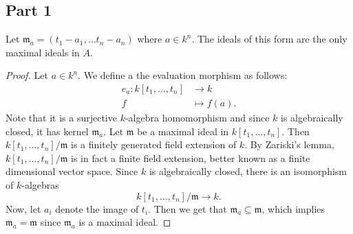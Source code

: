 \subsection{Part 1}
\begin{lemma}
Let $\mathfrak{m}_a = (t_1 - a_1, \ldots t_n - a_n)$ where $a\in k^n$. 
The ideals of this form are the only maximal ideals in $A$.
\end{lemma}
\begin{proof}
Let $a \in k^n$. 
We define a the evaluation morphism as follows: 
\begin{align*}
    e_{a}: k[t_1,\ldots, t_n]&\longrightarrow k \\
    f &\longmapsto f(a) .
\end{align*}
Note that it is a surjective $k$-algebra homomorphism and since $k$ is algebraically closed, 
it has kernel $\mathfrak{m}_{a}$. 
Let $\mathfrak{m}$ be a maximal ideal in $k[t_1, \ldots, t_n]$. Then $k[t_1, \ldots, t_n]/\mathfrak{m}$ is a finitely generated field extension of $k$. 
By Zariski's lemma, 
$k[t_1, \ldots, t_n]/\mathfrak{m}$ is in fact a finite field extension, 
better known as a finite dimensional vector space. 
Since $k$ is algebraically closed, 
there is an isomorphism of $k$-algebras
\begin{equation*}
    k[t_1, \ldots, t_n]/\mathfrak{m}\longrightarrow k .
\end{equation*}
Now, let $a_i$ denote the image of $t_i$. 
Then we get that $\mathfrak{m}_{a}\subseteq \mathfrak{m}$, 
which implies $\mathfrak{m}_{a} = \mathfrak{m}$ since $\mathfrak{m}_{a}$ is a maximal ideal. 
\end{proof}

